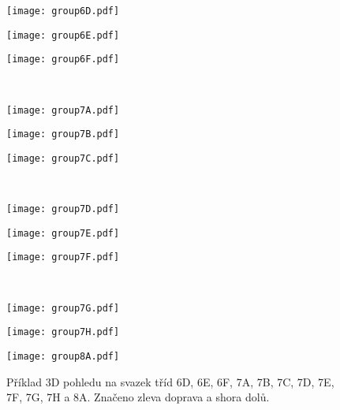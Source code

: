 \begin{figure}[htps]
\centering
\begin{minipage}[c]{0.325\textwidth}
\texttt{[image: group6D.pdf]}
\end{minipage}
\begin{minipage}[c]{0.325\textwidth}
\texttt{[image: group6E.pdf]}
\end{minipage}
\begin{minipage}[c]{0.325\textwidth}
\texttt{[image: group6F.pdf]}
\end{minipage}\\

\begin{minipage}[c]{0.325\textwidth}
\texttt{[image: group7A.pdf]}
\end{minipage}
\begin{minipage}[c]{0.325\textwidth}
\texttt{[image: group7B.pdf]}
\end{minipage}
\begin{minipage}[c]{0.325\textwidth}
\texttt{[image: group7C.pdf]}
\end{minipage}\\

\begin{minipage}[c]{0.325\textwidth}
\texttt{[image: group7D.pdf]}
\end{minipage}
\begin{minipage}[c]{0.325\textwidth}
\texttt{[image: group7E.pdf]}
\end{minipage}
\begin{minipage}[c]{0.325\textwidth}
\texttt{[image: group7F.pdf]}
\end{minipage}\\

\begin{minipage}[c]{0.325\textwidth}
\texttt{[image: group7G.pdf]}
\end{minipage}
\begin{minipage}[c]{0.325\textwidth}
\texttt{[image: group7H.pdf]}
\end{minipage}
\begin{minipage}[c]{0.325\textwidth}
\texttt{[image: group8A.pdf]}
\end{minipage}

\caption{Příklad 3D pohledu na svazek tříd 6D, 6E, 6F, 7A, 7B, 7C, 7D, 7E, 7F, 7G, 7H a 8A. Značeno zleva doprava a shora dolů.}
\label{fig:modelClass3D3}
\end{figure}



